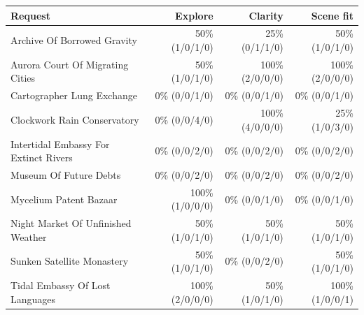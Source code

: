 \begin{tabularx}{\textwidth}{@{}Yrrr@{}}
\toprule
Request & Explore & Clarity & Scene fit \\
\midrule
Archive Of Borrowed Gravity & 50\% (1/0/1/0) & 25\% (0/1/1/0) & 50\% (1/0/1/0) \\
Aurora Court Of Migrating Cities & 50\% (1/0/1/0) & 100\% (2/0/0/0) & 100\% (2/0/0/0) \\
Cartographer Lung Exchange & 0\% (0/0/1/0) & 0\% (0/0/1/0) & 0\% (0/0/1/0) \\
Clockwork Rain Conservatory & 0\% (0/0/4/0) & 100\% (4/0/0/0) & 25\% (1/0/3/0) \\
Intertidal Embassy For Extinct Rivers & 0\% (0/0/2/0) & 0\% (0/0/2/0) & 0\% (0/0/2/0) \\
Museum Of Future Debts & 0\% (0/0/2/0) & 0\% (0/0/2/0) & 0\% (0/0/2/0) \\
Mycelium Patent Bazaar & 100\% (1/0/0/0) & 0\% (0/0/1/0) & 0\% (0/0/1/0) \\
Night Market Of Unfinished Weather & 50\% (1/0/1/0) & 50\% (1/0/1/0) & 50\% (1/0/1/0) \\
Sunken Satellite Monastery & 50\% (1/0/1/0) & 0\% (0/0/2/0) & 50\% (1/0/1/0) \\
Tidal Embassy Of Lost Languages & 100\% (2/0/0/0) & 50\% (1/0/1/0) & 100\% (1/0/0/1) \\
\bottomrule
\end{tabularx}
